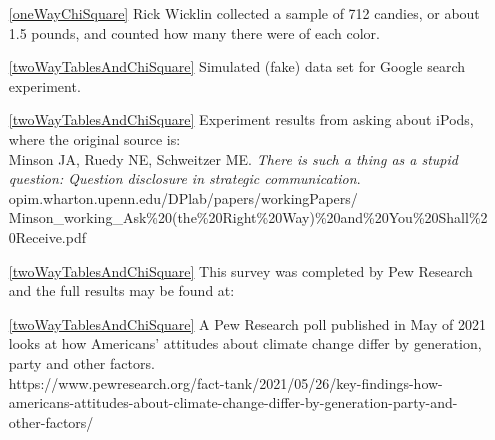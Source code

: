 \begin{itemize}
\item[\ref{oneWayChiSquare}]
    Rick Wicklin collected a sample of 712 candies, or about 1.5 pounds,
    and counted how many there were of each color.   \\

\item[\ref{twoWayTablesAndChiSquare}]
    Simulated (fake) data set for Google search experiment.

\item[\ref{twoWayTablesAndChiSquare}]
    Experiment results from asking about iPods, where the original source is:\\
    Minson JA, Ruedy NE, Schweitzer ME.
    \emph{There is such a thing as a stupid question:
    Question disclosure in strategic communication}. \\
    {\small{}
        {opim.wharton.upenn.edu/DPlab/papers/workingPapers/}}\\
    {\small{}
        {Minson\_working\_Ask\%20(the\%20Right\%20Way)\%20and\%20You\%20Shall\%20Receive.pdf}}

\item[\ref{twoWayTablesAndChiSquare}]
    This survey was completed by Pew Research and the full results
    may be found at:\\
    {\scriptsize{}}


\item[\ref{twoWayTablesAndChiSquare}]
    A Pew Research poll published in May of 2021 looks at how Americans’
    attitudes about climate change differ by generation, party and other factors.\\
      {\scriptsize{https://www.pewresearch.org/fact-tank/2021/05/26/key-findings-how-americans-attitudes-about-climate-change-differ-by-generation-party-and-other-factors/}}

\end{itemize}







